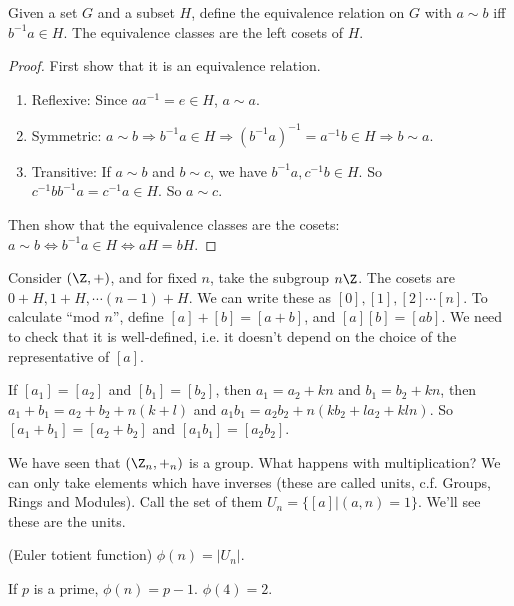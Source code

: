 \documentclass[a4pape]{article}
\begin{document}
\begin{lemma}
  Given a set $G$ and a subset $H$, define the equivalence relation on $G$ with $a\sim b$ iff $b^{-1}a\in H$. The equivalence classes are the left cosets of $H$.
\end{lemma}

\begin{proof}
  First show that it is an equivalence relation.
  \begin{enumerate}
  \item Reflexive: Since $aa^{-1} = e\in H$,  $a\sim a$.
  \item Symmetric: $a\sim b\Rightarrow b^{-1}a\in H \Rightarrow (b^{-1}a)^{-1} = a^{-1}b\in H\Rightarrow b\sim a$.
  \item Transitive: If $a\sim b$ and $b\sim c$, we have $b^{-1}a, c^{-1}b\in H$. So $c^{-1}bb^{-1}a = c^{-1}a\in H$. So $a\sim c$.
  \end{enumerate}
  Then show that the equivalence classes are the cosets: $a\sim b\Leftrightarrow b^{-1}a\in H \Leftrightarrow aH = bH$.
\end{proof}

\begin{eg}
 Consider $(\Z, +)$, and for fixed $n$, take the subgroup $n\Z$. The cosets are $0+ H, 1 + H, \cdots (n - 1)+H$. We can write these as $[0], [1], [2] \cdots [n]$. To calculate ``mod $n$'', define $[a] + [b] = [a + b]$, and $[a][b] = [ab]$. We need to check that it is well-defined, i.e. it doesn't depend on the choice of the representative of $[a]$.

If $[a_1] = [a_2]$ and $[b_1] = [b_2]$, then $a_1 = a_2 + kn$ and $b_1 = b_2 + kn$, then $a_1 + b_1 = a_2 + b_2 + n(k + l)$ and $a_1b_1 = a_2b_2 + n(kb_2 +la_2 + kln)$. So $[a_1 + b_1] = [a_2 + b_2]$ and $[a_1b_1] = [a_2b_2]$.
\end{eg}

We have seen that $(\Z_n, +_n)$ is a group. What happens with multiplication? We can only take elements which have inverses (these are called units, c.f. Groups, Rings and Modules). Call the set of them $U_n = \{[a] | (a, n) = 1\}$. We'll see these are the units.
\begin{defi}
  (Euler totient function) $\phi (n) = |U_n|$.
\end{defi}

\begin{eg}
  If $p$ is a prime, $\phi(n) = p - 1$. $\phi(4) = 2$.
\end{eg}
\end{document}
